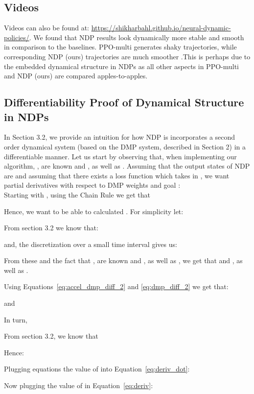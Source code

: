 \documentclass{article}
\newcommand{\our}{NDP\xspace}
\begin{document}
\subsection{Videos}
Videos can also be found at: \url{https://shikharbahl.github.io/neural-dynamic-policies/}.  We found that NDP results look dynamically more stable and smooth in comparison to the baselines. PPO-multi generates shaky trajectories, while corresponding NDP (ours) trajectories are much smoother .This is perhaps due to the embedded dynamical structure in NDPs as all other aspects in PPO-multi and NDP (ours) are compared apples-to-apples.

\subsection{Differentiability Proof of Dynamical Structure in NDPs}
In Section 3.2, we provide an intuition for how \our is incorporates a second order dynamical system (based on the DMP system, described in Section 2) in a differentiable manner. Let us start by observing that, when implementing our algorithm, ,  are known and , as well as . Assuming that the output states of \our are  and assuming that there exists a loss function  which takes in , we want partial derivatives with respect to DMP weights  and goal : \\  



Starting with , using the Chain Rule we get that


Hence, we want to be able to calculated . For simplicity let: 





From section 3.2 we know that: 

and, the discretization over a small time interval  gives us: 


From these and the fact that ,  are known and , as well as , we get that  and , as well as . 

Using Equations~\eqref{eq:accel_dmp_diff_2} and \eqref{eq:dmp_diff_2} we get that: 


and 


In turn, 


From section 3.2, we know that 


Hence: 


Plugging equations the value of  into Equation~\eqref{eq:deriv_dot}: 



Now plugging the value of  in Equation~\eqref{eq:deriv}: 
\end{document}
